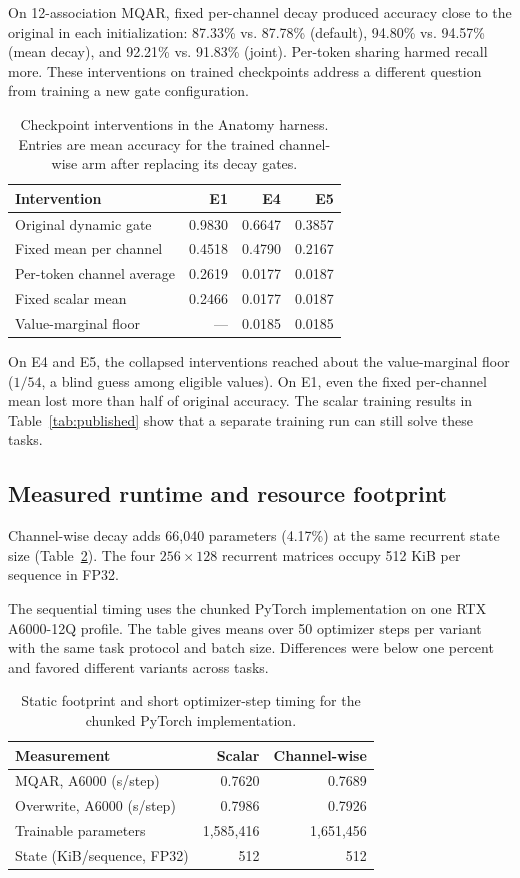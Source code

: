 \documentclass[conference]{IEEEtran}
\begin{document}
On 12-association MQAR, fixed per-channel decay produced accuracy close to the original in each initialization: 87.33\% vs. 87.78\% (default), 94.80\% vs. 94.57\% (mean decay), and 92.21\% vs. 91.83\% (joint). Per-token sharing harmed recall more. These interventions on trained checkpoints address a different question from training a new gate configuration.

\begin{table}[t]
\caption{Checkpoint interventions in the Anatomy harness. Entries are mean accuracy for the trained channel-wise arm after replacing its decay gates.}
\label{tab:interventions}
\centering
\small
\begin{tabular}{lrrr}
\toprule
Intervention & E1 & E4 & E5 \\
\midrule
Original dynamic gate & 0.9830 & 0.6647 & 0.3857 \\
Fixed mean per channel & 0.4518 & 0.4790 & 0.2167 \\
Per-token channel average & 0.2619 & 0.0177 & 0.0187 \\
Fixed scalar mean & 0.2466 & 0.0177 & 0.0187 \\
Value-marginal floor & --- & 0.0185 & 0.0185 \\
\bottomrule
\end{tabular}
\end{table}

On E4 and E5, the collapsed interventions reached about the value-marginal floor ($1/54$, a blind guess among eligible values). On E1, even the fixed per-channel mean lost more than half of original accuracy. The scalar training results in Table~\ref{tab:published} show that a separate training run can still solve these tasks.

\subsection{Measured runtime and resource footprint}
Channel-wise decay adds 66,040 parameters (4.17\%) at the same recurrent state size (Table~\ref{tab:cost}). The four $256\times128$ recurrent matrices occupy 512 KiB per sequence in FP32.

The sequential timing uses the chunked PyTorch implementation on one RTX A6000-12Q profile. The table gives means over 50 optimizer steps per variant with the same task protocol and batch size. Differences were below one percent and favored different variants across tasks.

\begin{table}[t]
\caption{Static footprint and short optimizer-step timing for the chunked PyTorch implementation.}
\label{tab:cost}
\centering
\small
\begin{tabular}{lrr}
\toprule
Measurement & Scalar & Channel-wise \\
\midrule
MQAR, A6000 (s/step) & 0.7620 & 0.7689 \\
Overwrite, A6000 (s/step) & 0.7986 & 0.7926 \\
Trainable parameters & 1,585,416 & 1,651,456 \\
State (KiB/sequence, FP32) & 512 & 512 \\
\bottomrule
\end{tabular}
\end{table}
\end{document}
